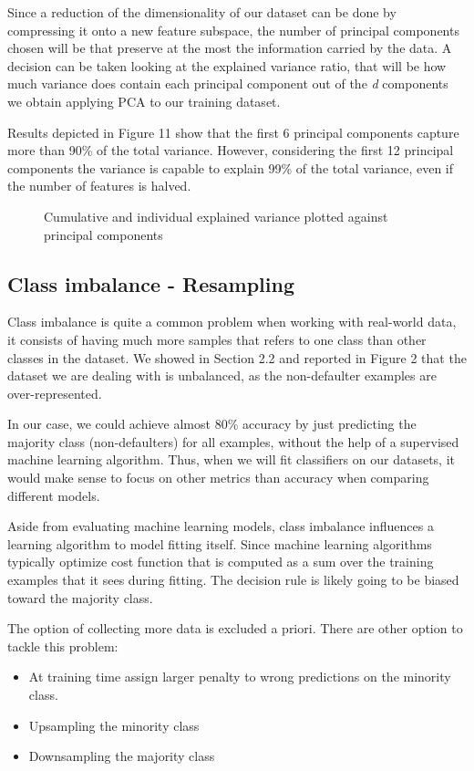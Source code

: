 \documentclass{article}
\begin{document}
Since a reduction of the dimensionality of our dataset can be done by compressing it onto a new feature subspace, the number of principal components chosen will be that preserve at the most the information carried by the data. A decision can be taken looking at the explained variance ratio, that will be how much variance does contain each principal component out of the \emph{d} components we obtain applying PCA to our training dataset.

Results depicted in Figure 11 show that the first 6 principal components capture more than 90\% of the total variance. However, considering the first 12 principal components the variance is capable to explain 99\% of the total variance, even if the number of features is halved.

\begin{figure}[H]
\centering

\caption{Cumulative and individual explained variance plotted against principal components}
\end{figure}


\subsection{Class imbalance - Resampling}

Class imbalance is quite a common problem when working with real-world data, it consists of having much more samples that refers to one class than other classes in the dataset.
We showed in Section 2.2 and reported in Figure 2 that the dataset we are dealing with is unbalanced, as the non-defaulter examples are over-represented.

In our case, we could achieve almost 80\% accuracy by just predicting the majority class (non-defaulters) for all examples, without the help of a supervised machine learning algorithm. Thus, when we will fit classifiers on our datasets, it would make sense to focus on other metrics than accuracy when comparing different models.

Aside from evaluating machine learning models, class imbalance influences a learning algorithm to model fitting itself. Since machine learning algorithms typically optimize cost function that is computed as a sum over the training examples that it sees during fitting. The decision rule is likely going to be biased toward the majority class.

The option of collecting more data is excluded a priori. There are other option to tackle this problem:
\begin{itemize}
    \item At training time assign larger penalty to wrong predictions on the minority class. 
    \item Upsampling the minority class
    \item Downsampling the majority class
\end{itemize}
\end{document}
